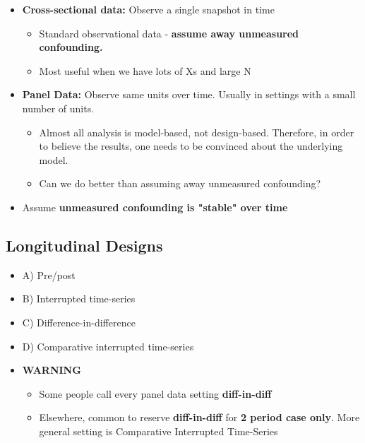 \begin{itemize}
    \item \textbf{Cross-sectional data:} Observe a single snapshot in time
        \begin{itemize}
            \item Standard observational data - \textbf{assume away unmeasured confounding.}
            \item Most useful when we have lots of Xs and large N
        \end{itemize}

    \item \textbf{Panel Data:} Observe same units over time. Usually in settings with a small number of units.
        \begin{itemize}
            \item Almost all analysis is model-based, not design-based. Therefore, in order to believe the results, one needs to be convinced about the underlying model.
            \item Can we do better than assuming away unmeasured confounding?
        \end{itemize}

    \item Assume \textbf{unmeasured confounding is "stable" over time}
\end{itemize}

\subsection*{Longitudinal Designs}

\begin{itemize}
    \item A) Pre/post
    \item B) Interrupted time-series
    \item C) Difference-in-difference
    \item D) Comparative interrupted time-series

    \item \textbf{WARNING}
        \begin{itemize}
            \item Some people call every panel data setting \textbf{diff-in-diff}
            \item Elsewhere, common to reserve \textbf{diff-in-diff} for \textbf{2 period case only}. More general setting is Comparative Interrupted Time-Series
        \end{itemize}
\end{itemize}

